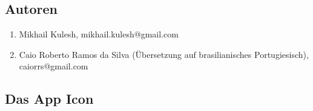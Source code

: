 \documentclass[DIV=calc, paper=a4, fontsize=11pt, twocolumn]{scrartcl}
\begin{document}
\subsection{Autoren}

\begin{enumerate}
\item Mikhail Kulesh,
mikhail.kulesh@gmail.com

\item Caio Roberto Ramos da Silva
(Übersetzung auf brasilianisches
Portugiesisch),
caiorrs@gmail.com
\end{enumerate}

\subsection{Das App Icon}
\end{document}
